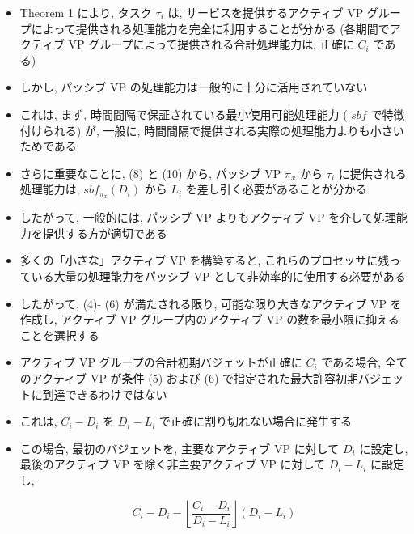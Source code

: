 \begin{frame}{}
    \begin{itemize}
        \item Theorem 1 により, タスク $\tau_{i}$ は, サービスを提供するアクティブ VP グループによって提供される処理能力を完全に利用することが分かる (各期間でアクティブ VP グループによって提供される合計処理能力は, 正確に $C_{i}$ である)
\item しかし, パッシブ VP の処理能力は一般的に十分に活用されていない
\item これは, まず, 時間間隔で保証されている最小使用可能処理能力 ( $s b f$ で特徴付けられる) が, 一般に, 時間間隔で提供される実際の処理能力よりも小さいためである
\item さらに重要なことに, (8) と (10) から, パッシブ VP $\pi_{x}$ から $\tau_{i}$ に提供される処理能力は, $s b f_{\pi_{x}}\left(D_{i}\right)$ から $L_{i}$ を差し引く必要があることが分かる
\item したがって, 一般的には, パッシブ VP よりもアクティブ VP を介して処理能力を提供する方が適切である
\item 多くの「小さな」アクティブ VP を構築すると, これらのプロセッサに残っている大量の処理能力をパッシブ VP として非効率的に使用する必要がある
\item したがって, (4)- (6) が満たされる限り, 可能な限り大きなアクティブ VP を作成し, アクティブ VP グループ内のアクティブ VP の数を最小限に抑えることを選択する
    \end{itemize}
\end{frame}

\begin{frame}{}
    \begin{itemize}
        \item アクティブ VP グループの合計初期バジェットが正確に $C_{i}$ である場合, 全てのアクティブ VP が条件 (5) および (6) で指定された最大許容初期バジェットに到達できるわけではない
\item これは, $C_{i}-D_{i}$ を $D_{i}-L_{i}$ で正確に割り切れない場合に発生する
\item この場合, 最初のバジェットを, 主要なアクティブ VP に対して $D_{i}$ に設定し, 最後のアクティブ VP を除く非主要アクティブ VP に対して $D_{i}-L_{i}$ に設定し,

              \begin{equation*}
                  C_{i}-D_{i}-\left\lfloor\frac{C_{i}-D_{i}}{D_{i}-L_{i}}\right\rfloor\left(D_{i}-L_{i}\right)
              \end{equation*}
    \end{itemize}
\end{frame}

